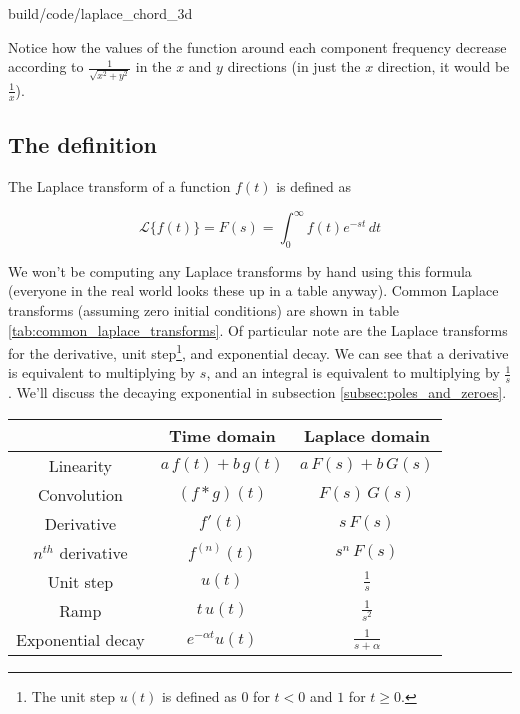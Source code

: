 \begin{svg}{build/code/laplace_chord_3d}
  \caption{Laplace transform of Fmajor4 chord plotted in 3D}
  \label{fig:laplace_chord_3d}
\end{svg}

Notice how the values of the function around each component frequency decrease
according to $\frac{1}{\sqrt{x^2 + y^2}}$ in the $x$ and $y$ directions (in just
the $x$ direction, it would be $\frac{1}{x}$).

\subsection{The definition}

The Laplace transform of a function $f(t)$ is defined as

\begin{equation*}
  \mathcal{L}\{f(t)\} = F(s) = \int_0^\infty f(t) e^{-st} \,dt
\end{equation*}

We won't be computing any Laplace transforms by hand using this formula
(everyone in the real world looks these up in a table anyway). Common Laplace
transforms (assuming zero initial conditions) are shown in table
\ref{tab:common_laplace_transforms}. Of particular note are the Laplace
transforms for the derivative, unit step\footnote{The unit step $u(t)$ is
defined as $0$ for $t < 0$ and $1$ for $t \ge 0$.}, and exponential decay. We
can see that a derivative is equivalent to multiplying by $s$, and an integral
is equivalent to multiplying by $\frac{1}{s}$. We'll discuss the decaying
exponential in subsection \ref{subsec:poles_and_zeroes}.

\begin{booktable}
  \begin{tabular}{|ccc|}
    \hline
    \rowcolor{headingbg}
    & \textbf{Time domain} & \textbf{Laplace domain} \\
    \hline
    Linearity & $a\,f(t) + b\,g(t)$ & $a\,F(s) + b\,G(s)$ \\
    Convolution & $(f * g)(t)$ & $F(s) \,G(s)$ \\
    Derivative & $f'(t)$ & $s \,F(s)$ \\
    $n^{th}$ derivative & $f^{(n)}(t)$ & $s^n \,F(s)$ \\
    Unit step & $u(t)$ & $\frac{1}{s}$ \\
    Ramp & $t \,u(t)$ & $\frac{1}{s^2}$ \\
    Exponential decay & $e^{-\alpha t} u(t)$ & $\frac{1}{s + \alpha}$ \\
    \hline
  \end{tabular}
  \caption{Common Laplace transforms and Laplace transform properties with zero
    initial conditions}
  \label{tab:common_laplace_transforms}
\end{booktable}

